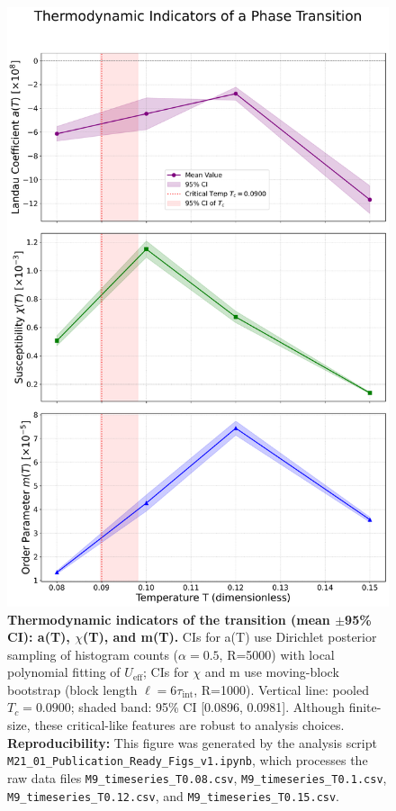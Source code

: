 \documentclass[a4paper,11pt,ja=standard,lualatex]{bxjsarticle}
\begin{document}
\begin{figure}[H]
    \centering
    \includegraphics[width=0.7\linewidth]{figures/fig1_transition.pdf}
    \caption{
        \textbf{Thermodynamic indicators of the transition (mean $\pm$95\% CI): a(T), $\chi$(T), and m(T).} 
        CIs for a(T) use Dirichlet posterior sampling of histogram counts ($\alpha=0.5$, R=5000) with local polynomial fitting of $U_{\mathrm{eff}}$; CIs for $\chi$ and m use moving-block bootstrap (block length $\ell=6\tau_{\mathrm{int}}$, R=1000). 
        Vertical line: pooled $T_c = 0.0900$; shaded band: 95\% CI [0.0896, 0.0981]. 
        Although finite-size, these critical-like features are robust to analysis choices.
        \newline\newline
        \textbf{Reproducibility:} This figure was generated by the analysis script \texttt{M21\_01\_Publication\_Ready\_Figs\_v1.ipynb}, which processes the raw data files \texttt{M9\_timeseries\_T0.08.csv}, \texttt{M9\_timeseries\_T0.1.csv}, \texttt{M9\_timeseries\_T0.12.csv}, and \texttt{M9\_timeseries\_T0.15.csv}.
    }
    \label{fig:transition}
\end{figure}

\end{document}
